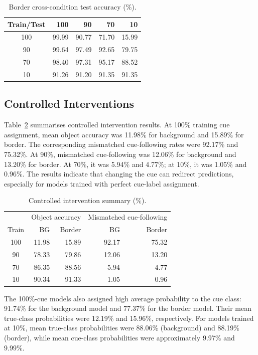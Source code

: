 \documentclass[conference]{IEEEtran}
\begin{document}
\begin{table}[t]
\caption{Border cross-condition test accuracy (\%).}
\label{tab:bordercross}
\centering
\footnotesize
\begin{tabular}{c|rrrr}
\toprule
Train/Test & 100 & 90 & 70 & 10\\
\midrule
100 & 99.99 & 90.77 & 71.70 & 15.99\\
90  & 99.64 & 97.49 & 92.65 & 79.75\\
70  & 98.40 & 97.31 & 95.17 & 88.52\\
10  & 91.26 & 91.20 & 91.35 & 91.35\\
\bottomrule
\end{tabular}
\end{table}

\subsection{Controlled Interventions}
Table~\ref{tab:intervention} summarises controlled intervention results. At 100\% training cue assignment, mean object accuracy was 11.98\% for background and 15.89\% for border. The corresponding mismatched cue-following rates were 92.17\% and 75.32\%. At 90\%, mismatched cue-following was 12.06\% for background and 13.20\% for border. At 70\%, it was 5.94\% and 4.77\%; at 10\%, it was 1.05\% and 0.96\%. The results indicate that changing the cue can redirect predictions, especially for models trained with perfect cue-label assignment.

\begin{table}[t]
\caption{Controlled intervention summary (\%).}
\label{tab:intervention}
\centering
\scriptsize
\begin{tabular}{c|rr|rr}
\toprule
& \multicolumn{2}{c|}{Object accuracy} & \multicolumn{2}{c}{Mismatched cue-following}\\
Train & BG & Border & BG & Border\\
\midrule
100 & 11.98 & 15.89 & 92.17 & 75.32\\
90  & 78.33 & 79.86 & 12.06 & 13.20\\
70  & 86.35 & 88.56 & 5.94 & 4.77\\
10  & 90.34 & 91.33 & 1.05 & 0.96\\
\bottomrule
\end{tabular}
\end{table}

The 100\%-cue models also assigned high average probability to the cue class: 91.74\% for the background model and 77.37\% for the border model. Their mean true-class probabilities were 12.19\% and 15.96\%, respectively. For models trained at 10\%, mean true-class probabilities were 88.06\% (background) and 88.19\% (border), while mean cue-class probabilities were approximately 9.97\% and 9.99\%.
\end{document}
